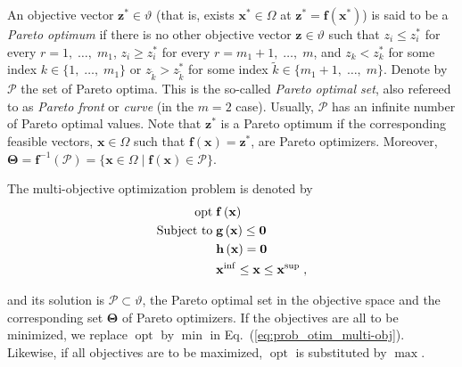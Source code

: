 \documentclass[final,5p,times,twocolumn,numbers]{elsarticle}
\DeclareMathOperator*{\opt}{opt}
\begin{document}
An objective vector $ \mathbf{z}^{*} \in \vartheta $ (that is, exists $ \mathbf{x}^{*} \in \Omega $ at $ \mathbf{z}^{*} = \mathbf{f} \left( \mathbf{x}^{*} \right) $) is said to be a \textit{Pareto optimum} if there is no other objective vector $ \mathbf{z} \in \vartheta $ such that $ z_{i} \leq z_{i}^{*} $ for every $ r = 1, \; \dots, \; m_{1} $, $ z_{i} \geq z_{i}^{*} $ for every $ r = m_{1} + 1, \; \dots, \; m $, and $ z_{k} < z_{k}^{*} $ for some index $ k \in \lbrace 1, \; \dots, \; m_{1} \rbrace $ or $ z_{\tilde{k}} > z_{\tilde{k}}^{*} $ for some index $ \tilde{k} \in \lbrace m_{1} + 1, \; \dots, \; m \rbrace $. Denote by $ \boldsymbol{\mathcal{P}} $ the set of Pareto optima. This is the so-called \textit{Pareto optimal set}, also refereed to as \textit{Pareto front} or \textit{curve} (in the $ m = 2 $ case). Usually, $ \boldsymbol{\mathcal{P}} $ has an infinite number of Pareto optimal values. Note that $ \mathbf{z}^{*} $ is a Pareto optimum if the corresponding feasible vectors, $ \mathbf{x} \in \Omega $ such that $ \mathbf{f} \left( \mathbf{x} \right) = \mathbf{z}^{*} $, are Pareto optimizers. Moreover, $ \mathbf{\Theta} = \mathbf{f}^{-1} \left( \boldsymbol{\mathcal{P}} \right) = \lbrace \mathbf{x} \in \Omega \; \vert \; \mathbf{f} \left( \mathbf{x} \right) \in \boldsymbol{\mathcal{P}} \rbrace $.

The multi-objective optimization problem is denoted by
%
\begin{align} \label{eq:prob_otim_multi-obj}
\begin{split}
\opt \; &\mathbf{f} \left( \mathbf{x} \right)\\
\textrm{Subject to} \; &\mathbf{g} \left( \mathbf{x} \right) \leq \mathbf{0}\\
\hphantom{\textrm{Subject to}} &\mathbf{h} \left( \mathbf{x} \right) = \mathbf{0}\\
\hphantom{\textrm{Subject to}} &\mathbf{x}^{\mathrm{inf}} \leq \mathbf{x} \leq \mathbf{x}^{\mathrm{sup}} \; ,
\end{split}
\end{align}

\noindent and its solution is $ \boldsymbol{\mathcal{P}} \subset \vartheta $, the Pareto optimal set in the objective space and the corresponding set $ \mathbf{\Theta} $ of Pareto optimizers. If the objectives are all to be minimized, we replace $ \opt $ by $ \min $ in Eq.~(\ref{eq:prob_otim_multi-obj}). Likewise, if all objectives are to be maximized, $ \opt $ is substituted by $ \max $.
\end{document}
